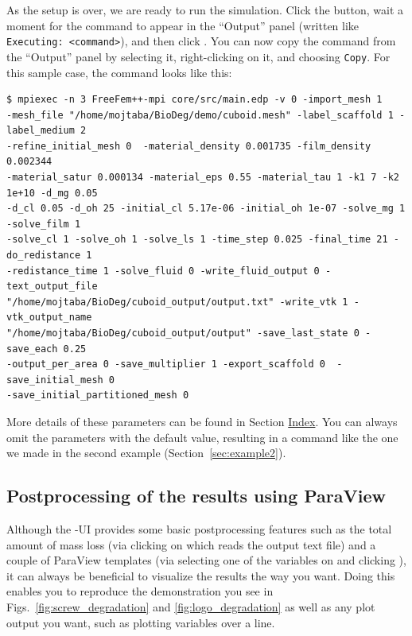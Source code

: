 As the setup is over, we are ready to run the simulation. Click the  button, wait a moment for the command to appear in the ``Output'' panel (written  like \verb|Executing: <command>|), and then click . You can now copy the command from the ``Output'' panel by selecting it, right-clicking on it, and choosing \verb|Copy|. For this sample case, the command looks like this:

\begin{verbatim}
$ mpiexec -n 3 FreeFem++-mpi core/src/main.edp -v 0 -import_mesh 1 
-mesh_file "/home/mojtaba/BioDeg/demo/cuboid.mesh" -label_scaffold 1 -label_medium 2 
-refine_initial_mesh 0  -material_density 0.001735 -film_density 0.002344 
-material_satur 0.000134 -material_eps 0.55 -material_tau 1 -k1 7 -k2 1e+10 -d_mg 0.05 
-d_cl 0.05 -d_oh 25 -initial_cl 5.17e-06 -initial_oh 1e-07 -solve_mg 1 -solve_film 1 
-solve_cl 1 -solve_oh 1 -solve_ls 1 -time_step 0.025 -final_time 21 -do_redistance 1  
-redistance_time 1 -solve_fluid 0 -write_fluid_output 0 -text_output_file 
"/home/mojtaba/BioDeg/cuboid_output/output.txt" -write_vtk 1 -vtk_output_name 
"/home/mojtaba/BioDeg/cuboid_output/output" -save_last_state 0 -save_each 0.25 
-output_per_area 0 -save_multiplier 1 -export_scaffold 0  -save_initial_mesh 0 
-save_initial_partitioned_mesh 0
\end{verbatim}

More details of these parameters can be found in Section \hyperref[sec:index]{Index}. You can always omit the parameters with the default value, resulting in a command like the one we made in the second example (Section~\ref{sec:example2}).

\subsection{Postprocessing of the results using ParaView} \label{sec:postprocess}

Although the \biodeg{}-UI provides some basic postprocessing features such as the total amount of mass loss (via clicking on  which reads the output text file) and a couple of ParaView templates (via selecting one of the variables on  and clicking ), it can always  be beneficial to visualize the results the way you want. Doing this enables you to reproduce the demonstration you see in Figs.~\ref{fig:screw_degradation} and \ref{fig:logo_degradation} as well as any plot output you want, such as plotting variables over a line.

